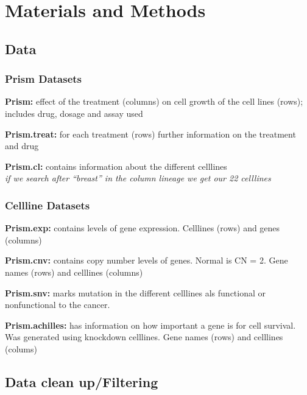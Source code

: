\documentclass[
  11pt,
]{article}
\begin{document}
\hypertarget{materials-and-methods}{%
\section{Materials and Methods}\label{materials-and-methods}}

\hypertarget{data}{%
\subsection{Data}\label{data}}

\hypertarget{prism-datasets}{%
\subsubsection{Prism Datasets}\label{prism-datasets}}

\textbf{Prism:} effect of the treatment (columns) on cell growth of the
cell lines (rows); includes drug, dosage and assay used

\textbf{Prism.treat:} for each treatment (rows) further information on
the treatment and drug

\textbf{Prism.cl:} contains information about the different celllines\\
\emph{if we search after ``breast'' in the column lineage we get our 22
celllines}

\hypertarget{cellline-datasets}{%
\subsubsection{Cellline Datasets}\label{cellline-datasets}}

\textbf{Prism.exp:} contains levels of gene expression. Celllines (rows)
and genes (columns)

\textbf{Prism.cnv:} contains copy number levels of genes. Normal is CN =
2. Gene names (rows) and celllines (columns)

\textbf{Prism.snv:} marks mutation in the different celllines als
functional or nonfunctional to the cancer.

\textbf{Prism.achilles:} has information on how important a gene is for
cell survival. Was generated using knockdown celllines. Gene names
(rows) and celllines (colums)

\hypertarget{data-clean-upfiltering}{%
\subsection{Data clean up/Filtering}\label{data-clean-upfiltering}}
\end{document}
